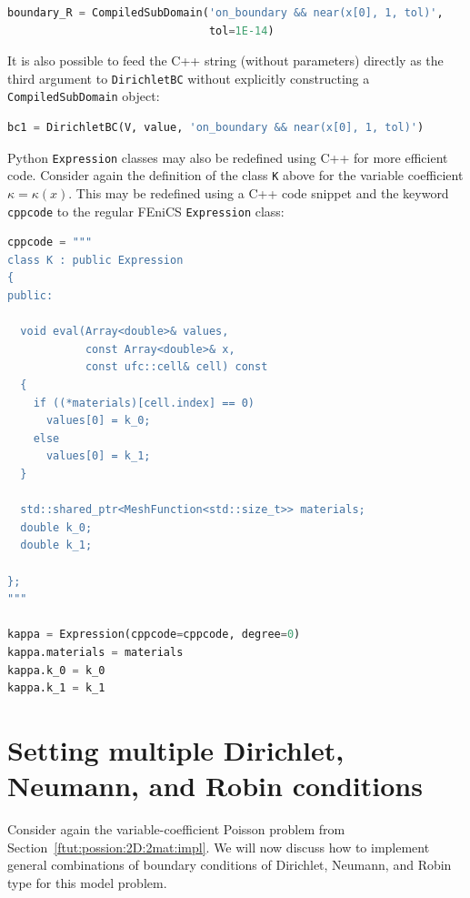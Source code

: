 \documentclass[graybox,envcountchap,sectrefs,final]{svmonodo}
\begin{document}
\begin{lstlisting}[language=Python,style=graycolor]
boundary_R = CompiledSubDomain('on_boundary && near(x[0], 1, tol)',
                               tol=1E-14)
\end{lstlisting}

It is also possible to feed the C++ string (without parameters)
directly as the third argument to \texttt{DirichletBC} without explicitly
constructing a \texttt{CompiledSubDomain} object:

\begin{lstlisting}[language=Python,style=graycolor]
bc1 = DirichletBC(V, value, 'on_boundary && near(x[0], 1, tol)')
\end{lstlisting}

Python \texttt{Expression} classes may also be redefined using C++ for more
efficient code. Consider again the definition of the class \texttt{K} above
for the variable coefficient $\kappa = \kappa(x)$. This may be redefined using a
C++ code snippet and the keyword \texttt{cppcode} to the regular FEniCS
\texttt{Expression} class:

\begin{lstlisting}[language=Python,style=graycolor]
cppcode = """
class K : public Expression
{
public:

  void eval(Array<double>& values,
            const Array<double>& x,
            const ufc::cell& cell) const
  {
    if ((*materials)[cell.index] == 0)
      values[0] = k_0;
    else
      values[0] = k_1;
  }

  std::shared_ptr<MeshFunction<std::size_t>> materials;
  double k_0;
  double k_1;

};
"""

kappa = Expression(cppcode=cppcode, degree=0)
kappa.materials = materials
kappa.k_0 = k_0
kappa.k_1 = k_1
\end{lstlisting}

\section{Setting multiple Dirichlet, Neumann, and Robin conditions}
\label{ch:poisson0:multi:bc}

Consider again the variable-coefficient Poisson problem
from Section~\ref{ftut:possion:2D:2mat:impl}. We will now discuss
how to implement general combinations of boundary conditions of
Dirichlet, Neumann, and Robin type for this model problem.
\end{document}
